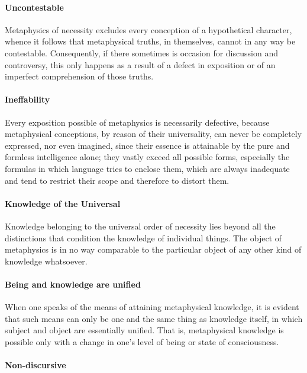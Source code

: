 \paragraph{Uncontestable}


Metaphysics of necessity excludes every conception of a hypothetical character, whence it follows that metaphysical truths, in themselves, cannot in any way be contestable. Consequently, if there sometimes is occasion for discussion and controversy, this only happens as a result of a defect in exposition or of an imperfect comprehension of those truths.

\paragraph{Ineffability}


Every exposition possible of metaphysics is necessarily defective, because metaphysical conceptions, by reason of their universality, can never be completely expressed, nor even imagined, since their essence is attainable by the pure and formless intelligence alone; they vastly exceed all possible forms, especially the formulas in which language tries to enclose them, which are always inadequate and tend to restrict their scope and therefore to distort them.

\paragraph{Knowledge of the Universal}


Knowledge belonging to the universal order of necessity lies beyond all the distinctions that condition the knowledge of individual things. The object of metaphysics is in no way comparable to the particular object of any other kind of knowledge whatsoever.

\paragraph{Being and knowledge are unified}


When one speaks of the means of attaining metaphysical knowledge, it is evident that such means can only be one and the same thing as knowledge itself, in which subject and object are essentially unified. That is, metaphysical knowledge is possible only with a change in one's level of being or state of consciousness. 

\paragraph{Non-discursive}


